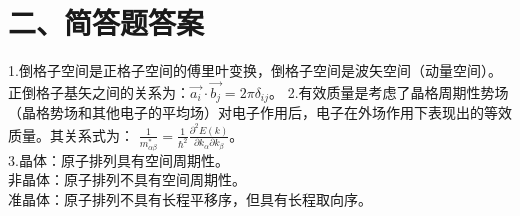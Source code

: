 \documentclass[UTF8]{ctexart}
\begin{document}
\section*{\bfseries 二、简答题答案}
1.倒格子空间是正格子空间的傅里叶变换，倒格子空间是波矢空间（动量空间）。\\
正倒格子基矢之间的关系为：$\vec{a_i}\cdot\vec{b_j}=2\pi\delta_{ij}$。
2.有效质量是考虑了晶格周期性势场（晶格势场和其他电子的平均场）对电子作用后，电子在外场作用下表现出的等效质量。其关系式为：
$\frac{1}{m^*_{\alpha\beta}}=\frac{1}{\hbar^2}\frac{\partial^2E(k)}{\partial k_\alpha\partial k_\beta}$。\\
3.晶体：原子排列具有空间周期性。\\
非晶体：原子排列不具有空间周期性。\\
准晶体：原子排列不具有长程平移序，但具有长程取向序。\\
\end{document}
